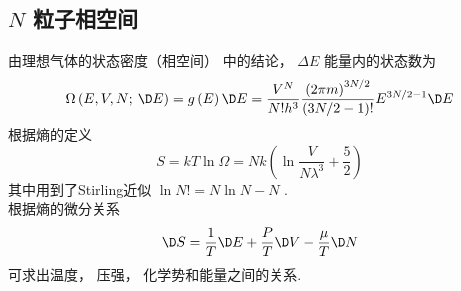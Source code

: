 
\subsection{$N$ 粒子相空间}

  由理想气体的状态密度（相空间）%
  中的结论， $\Delta E$ 能量内的状态数为
  \begin{equation}
    \Omega \left( {E,V,N;{\kern 1pt} {\kern 1pt} \D E} \right) = g\left( E \right)\D E = \frac{V^N}{N!{h^3}}\frac{{\left( {2\pi m} \right)}^{3N/2}}{\left( {3N/2 - 1} \right)!}{E^{3N/2 - 1}}\D E
  \end{equation}
  根据熵的定义%
  \begin{equation}
    S = kT\ln \Omega  = Nk\left( {\ln \frac{V}{N{\lambda ^3}} + \frac{5}{2}} \right)
  \end{equation}
  其中用到了Stirling近似%
   $\ln N! = N\ln N - N$ . \\
   根据熵的微分关系
   \begin{equation}
     \D S = \frac{1}{T}\D E + \frac{P}{T}\D V - \frac{\mu }{T}\D N
   \end{equation}
   可求出温度， 压强， 化学势和能量之间的关系.
